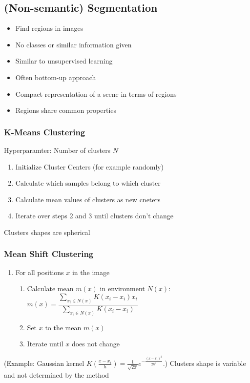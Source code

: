 \begin{multicols}{2}
    \subsection{(Non-semantic) Segmentation}
    \begin{itemize}
        \item Find regions in images
        \item No classes or similar information given
        \item Similar to unsupervised learning
        \item Often \glqq bottom-up\grqq{} approach
        \item Compact representation of a scene in terms of regions
        \item Regions share common properties
    \end{itemize}

    \subsubsection{K-Means Clustering}
    Hyperparamter: Number of clusters $N$
    \begin{enumerate}
        \item Initialize Cluster Centers (for example randomly)
        \item Calculate which samples belong to which cluster
        \item Calculate mean values of clusters as new cneters
        \item Iterate over steps 2 and 3 until clusters don't change
    \end{enumerate}
    Clusters shapes are spherical

    \subsubsection{Mean Shift Clustering}
    \begin{enumerate}
        \item For all positions $x$ in the image
              \begin{enumerate}
                  \item Calculate mean $m(x)$ in environment $N(x)$: $m(x)=\dfrac{\sum_{x_i \in N(x)} K(x_i-x_i)x_i}{\sum_{x_i \in N(x)} K(x_i-x_i)}$
                  \item Set $x$ to the mean $m(x)$
                  \item Iterate until $x$ does not change
              \end{enumerate}
    \end{enumerate}
    (Example: Gaussian kernel $K(\frac{x-x_i}{h})=\frac{1}{\sqrt{2\pi}}e^{-\frac{(x-x_i)^2}{2h^2}}$.)
    Clusters shape is variable and not determined by the method


\end{multicols}
